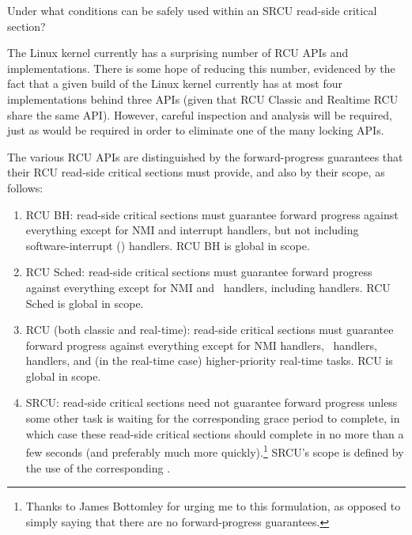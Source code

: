 \QuickQuiz{}
	Under what conditions can  be safely
	used within an SRCU read-side critical section?
 \QuickQuizEnd

The Linux kernel currently has a surprising number of RCU APIs and
implementations.
There is some hope of reducing this number, evidenced by the fact
that a given build of the Linux kernel currently has at most
four implementations behind three APIs (given that RCU Classic
and Realtime RCU share the same API).
However, careful inspection and analysis will be required, just as
would be required in order to eliminate one of the many locking APIs.

The various RCU APIs are distinguished by the forward-progress
guarantees that their RCU read-side critical sections must provide,
and also by their scope, as follows:

\begin{enumerate}
\item	RCU BH: read-side critical sections
	must guarantee forward progress against everything except for
	NMI and interrupt handlers, but not including software-interrupt
	() handlers.
	RCU BH is global in scope.
\item	RCU Sched: read-side critical sections must guarantee forward
	progress against everything except for NMI and \IRQ\ handlers,
	including  handlers.
	RCU Sched is global in scope.
\item	RCU (both classic and real-time): read-side critical sections
	must guarantee forward progress against everything except for
	NMI handlers, \IRQ\ handlers,  handlers, and (in the
	real-time case) higher-priority real-time tasks.
	RCU is global in scope.
\item	SRCU: read-side critical sections need not guarantee
	forward progress unless some other task is waiting for the
	corresponding grace period to complete, in which case these
	read-side critical sections should complete in no more than
	a few seconds (and preferably much more quickly).\footnote{
		Thanks to James Bottomley for urging me to this
		formulation, as opposed to simply saying that
		there are no forward-progress guarantees.}
	SRCU's scope is defined by the use of the corresponding
	.
\end{enumerate}

